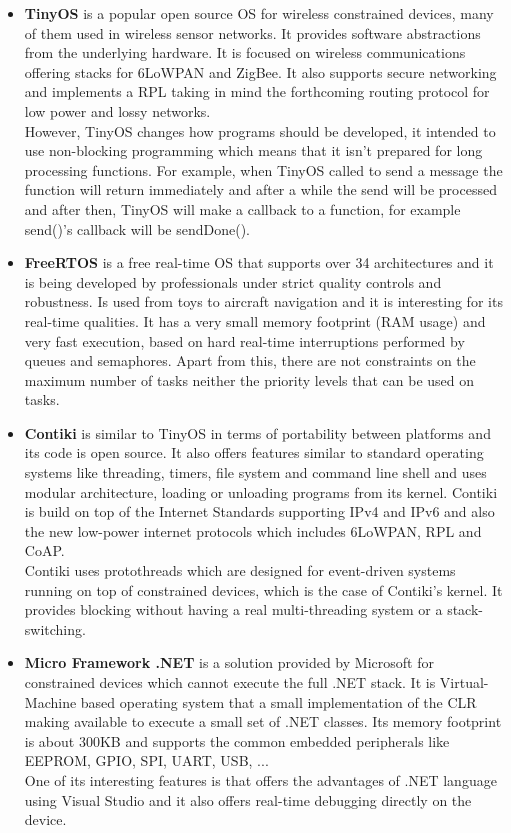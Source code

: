 \begin{itemize}
\item \textbf{TinyOS} is a popular open source OS for wireless constrained devices, many of them used in wireless sensor networks. It provides software abstractions from the underlying hardware. It is focused on wireless communications offering stacks for 6LoWPAN and ZigBee. It also supports secure networking and implements a RPL taking in mind the forthcoming routing protocol for low power and lossy networks.
\\
However, TinyOS changes how programs should be developed, it intended to use non-blocking programming which means that it isn't prepared for long processing functions. For example, when TinyOS called to send a message the function will return immediately and after a while the send will be processed and after then, TinyOS will make a callback to a function, for example send()'s callback will be sendDone().

\item \textbf{FreeRTOS} is a free real-time OS that supports over 34 architectures and it is being developed by professionals under strict quality controls and robustness. Is used from toys to aircraft navigation and it is interesting for its real-time qualities. It has a very small memory footprint (RAM usage) and very fast execution, based on hard real-time interruptions performed by queues and semaphores. Apart from this, there are not constraints on the maximum number of tasks neither the priority levels that can be used on tasks. 

\item \textbf{Contiki} is similar to TinyOS in terms of portability between platforms and its code is open source. It also offers features similar to standard operating systems like threading, timers, file system and command line shell and uses modular architecture, loading or unloading programs from its kernel. Contiki is build on top of the Internet Standards supporting IPv4 and IPv6 and also the new low-power internet protocols which includes 6LoWPAN, RPL and CoAP.
\\
Contiki uses protothreads which are designed for event-driven systems running on top of constrained devices, which is the case of Contiki's kernel. It provides blocking without having a real multi-threading system or a stack-switching.

\item \textbf{Micro Framework .NET} is a solution provided by Microsoft for constrained devices which cannot execute the full .NET stack. It is Virtual-Machine based operating system that a small implementation of the CLR making available to execute a small set of .NET classes. Its memory footprint is about 300KB and supports the common embedded peripherals like EEPROM, GPIO, SPI, UART, USB, ...
\\
One of its interesting features is that offers the advantages of .NET language using Visual Studio and it also offers real-time debugging directly on the device.
\end{itemize}



